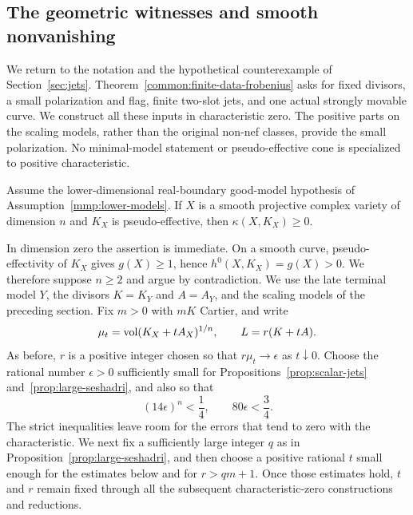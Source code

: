 \subsection{The geometric witnesses and smooth nonvanishing}
\label{fr:geometric-witnesses}

We return to the notation and the hypothetical counterexample of
Section~\ref{sec:jets}. Theorem~\ref{common:finite-data-frobenius}
asks for fixed divisors, a small polarization and flag, finite two-slot
jets, and one actual strongly movable curve. We construct all these
inputs in characteristic zero. The positive parts on the scaling
models, rather than the original non-nef classes, provide the small
polarization. No minimal-model statement or pseudo-effective cone is
specialized to positive characteristic.

\begin{theorem}
\label{thm:smooth-nonvanishing}
Assume the lower-dimensional real-boundary good-model hypothesis of
Assumption~\ref{mmp:lower-models}.
If \(X\) is a smooth projective complex variety of dimension \(n\) and
\(K_X\) is pseudo-effective, then \(\kappa(X,K_X)\geq0\).
\end{theorem}

In dimension zero the assertion is immediate.  On a smooth curve,
pseudo-effectivity of \(K_X\) gives \(g(X)\geq1\), hence
\(h^0(X,K_X)=g(X)>0\). We therefore suppose \(n\geq2\) and argue by
contradiction. We use the late terminal model \(Y\), the divisors
\(K=K_Y\) and \(A=A_Y\), and the scaling models of the preceding
section. Fix \(m>0\) with \(mK\) Cartier, and write
\[
 \mu_t=\operatorname{vol}(K_X+tA_X)^{1/n},\qquad
 L=r(K+tA).
\]
As before, \(r\) is a positive integer chosen so that
\(r\mu_t\longrightarrow\epsilon\) as \(t\downarrow0\).
Choose the rational number \(\epsilon>0\) sufficiently small for
Propositions~\ref{prop:scalar-jets} and~\ref{prop:large-seshadri}, and also
so that
\begin{equation}
\label{fr:epsilon}
 (14\epsilon)^n<\frac14,\qquad
 80\epsilon<\frac34.
\end{equation}
The strict inequalities leave room for the errors that tend to zero
with the characteristic.  We next fix a sufficiently large integer
\(q\) as in Proposition~\ref{prop:large-seshadri}, and then choose
a positive rational \(t\) small enough for the estimates below and for
\(r>qm+1\). Once those estimates hold, \(t\) and \(r\) remain fixed
through all the subsequent characteristic-zero constructions and
reductions.

